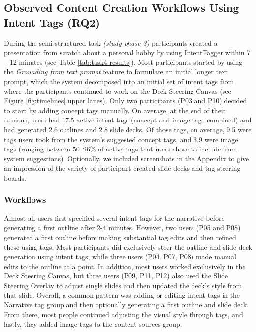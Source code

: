 \subsection{Observed Content Creation Workflows Using Intent Tags (RQ2)}

During the semi-structured task \textit{(study phase 3)} participants created a presentation from scratch about a personal hobby by using IntentTagger within 7 – 12 minutes (see Table \ref{tab:task4-results}).
Most participants started by using the \textit{Grounding from text prompt} feature to formulate an initial longer text prompt, which the system decomposed into an initial set of intent tags from where the participants continued to work on the Deck Steering Canvas (see Figure \ref{fig:timelines} upper lanes). 
Only two participants (P03 and P10) decided to start by adding concept tags manually.
On average, at the end of their sessions, users had 17.5 active intent tags (concept and image tags combined) and had generated 2.6 outlines and 2.8 slide decks. Of those tags, on average, 9.5 were tags users took from the system's suggested concept tags, and 3.9 were image tags (ranging between 50–96\% of active tags that users chose to include from system suggestions). 
Optionally, we included screenshots in the Appendix to give an impression of the variety of participant-created slide decks and tag steering boards.

\subsubsection{\textbf{Workflows}}
Almost all users first specified several intent tags for the narrative before generating a first outline after 2-4 minutes. 
However, two users (P05 and P08) generated a first outline before making substantial tag edits and then refined these using tags. 
Most participants did exclusively steer the outline and slide deck generation using intent tags, while three users (P04, P07, P08) made manual edits to the outline at a point.
In addition, most users worked exclusively in the Deck Steering Canvas, but three users (P09, P11, P12) also used the Slide Steering Overlay to adjust single slides and then updated the deck's style from that slide. 
Overall, a common pattern was adding or editing intent tags in the Narrative tag group and then optionally generating a first outline and slide deck. From there, most people continued adjusting the visual style through tags, and lastly, they added image tags to the content sources group. 


